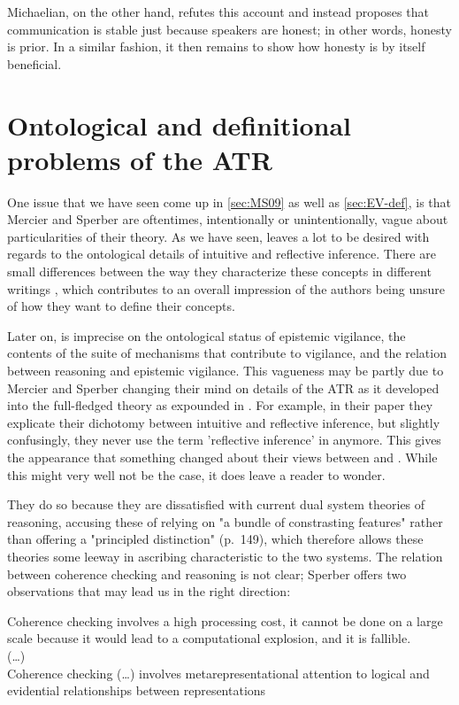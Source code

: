 Michaelian, on the other hand, refutes this account and instead proposes that communication is stable just because speakers are honest; in other words, honesty is prior. In a similar fashion, it then remains to show how honesty is by itself beneficial.

\section{Ontological and definitional problems of the ATR}
\label{sec:ont-atr}

One issue that we have seen come up in \cref{sec:MS09} as well as \cref{sec:EV-def}, is that Mercier and Sperber are oftentimes, intentionally or unintentionally, vague about particularities of their theory. As we have seen, \citet{MS09} leaves a lot to be desired with regards to the ontological details of intuitive and reflective inference. There are small differences between the way they characterize these concepts in different writings \citep{MS09, MS11}, which contributes to an overall impression of the authors being unsure of how they want to define their concepts.

Later on, \citet{Sperber10} is imprecise on the ontological status of epistemic vigilance, the contents of the suite of mechanisms that contribute to vigilance, and the relation between reasoning and epistemic vigilance.
This vagueness may be partly due to Mercier and Sperber changing their mind on details of the ATR as it developed into the full-fledged theory as expounded in \citet{MS17}.
For example, in their \citeyear{MS09} paper they explicate their dichotomy between intuitive and reflective inference, but slightly confusingly, they never use the term 'reflective inference' in \citet{MS11} anymore. This gives the appearance that something changed about their views between \citeyear{MS09} and \citeyear{MS11}. While this might very well not be the case, it does leave a reader to wonder.

They do so because they are dissatisfied with current dual system theories of reasoning, accusing these of relying on "a bundle of constrasting features" rather than offering a "principled distinction" (p.~149), which therefore allows these theories some leeway in ascribing characteristic to the two systems.
The relation between coherence checking and reasoning is not clear; Sperber
offers two observations that may lead us in the right direction:
\begin{quoting}
    Coherence checking involves a high processing cost, it cannot be done on a large scale because it would lead to a computational explosion, and it is fallible.
    \\ (\ldots) \\
    Coherence checking (\ldots) involves metarepresentational attention to logical and evidential relationships between representations
    \hfill \citep[p.~410]{Sperber01}
\end{quoting}

